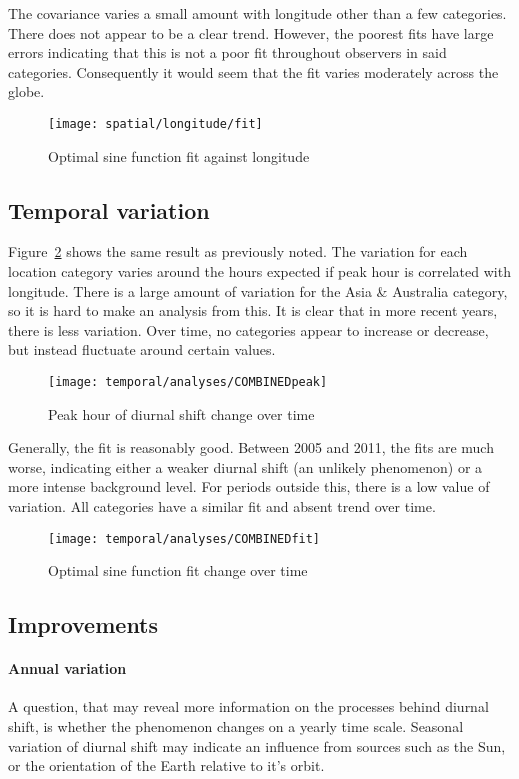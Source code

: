 The covariance varies a small amount with longitude other than a few categories. There does not appear to be a clear trend.  However, the poorest fits have large errors indicating that this is not a poor fit throughout observers in said categories. Consequently it would seem that the fit varies moderately across the globe. 
\begin{figure}[h!]
	\centering
	\texttt{[image: spatial/longitude/fit]}
	\caption{Optimal sine function fit against longitude
		\label{fig:dishift:lon:fit}}
\end{figure}


\subsection{Temporal variation}
Figure~\ref{fig:dishift:temp:peak} shows the same result as previously noted. The variation for each location category varies around the hours expected if peak hour is correlated with longitude. There is a large amount of variation for the Asia \& Australia category, so it is hard to make an analysis from this. It is clear that in more recent years, there is less variation. Over time, no categories appear to increase or decrease, but instead fluctuate around certain values.
\begin{figure}[h!]
	\centering
	\texttt{[image: temporal/analyses/COMBINEDpeak]}
	\caption{Peak hour of diurnal shift change over time
		\label{fig:dishift:temp:peak}}
\end{figure}
Generally, the fit is reasonably good. Between 2005 and 2011, the fits are much worse, indicating either a weaker diurnal shift (an unlikely phenomenon) or a more intense background level. For periods outside this, there is a low value of variation. All categories have a similar fit and absent trend over time.
\begin{figure}[h!]
	\centering
	\texttt{[image: temporal/analyses/COMBINEDfit]}
	\caption{Optimal sine function fit change over time
		\label{fig:dishift:temp:fit}}
\end{figure}
\subsection{Improvements}
\paragraph{Annual variation\\}
A question, that may reveal more information on the processes behind diurnal shift, is whether the phenomenon changes on a yearly time scale. Seasonal variation of diurnal shift may indicate an influence from sources such as the Sun, or the orientation of the Earth relative to it's orbit.

